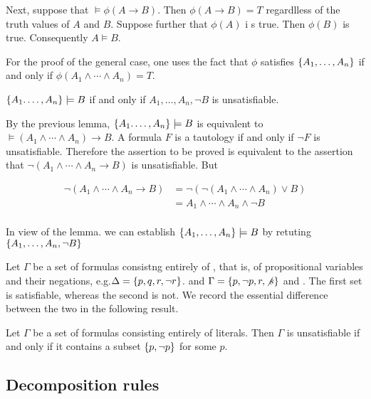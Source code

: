 Next, suppose that $\models \phi(A \to B)$.  Then $\phi(A \to B) = T$ regardlless of the truth values of $A$ and $B$.  Suppose further that $\phi(A)$ i s true. Then $\phi(B)$ is true.  Consequently $A \models B$.

For the proof of the general case, one uses the fact that $\phi$ satisfies $\{ A_1, \ldots, A_n \}$ if and only if $\phi(A_1 \land \cdots \land A_n) = T$. 

\begin{lemma}
$\{ A_1. \ldots , A_n \} \models B$ if and only if $A_1, \ldots , A_n, \neg B$ is unsatisfiable.
\end{lemma}

 By the previous lemma, $\{ A_1. \ldots , A_n \} \models B$  is equivalent to $\models (A_1 \land \cdots \land A_n) \to B$. A formula $F$ is a tautology if and only if $\neg F$ is unsatisfiable.  Therefore the assertion to be proved is equivalent to the assertion that $\neg (A_1 \land \cdots \land A_n \to B)$ is unsatisfiable.  But

\begin{align}
  \neg (A_1 \land \cdots \land A_n \to B) &=  \neg(\neg(A_1 \land \cdots \land A_n) \lor B) \\
  &= A_1 \land \cdots \land A_n \land \neg B \\
\end{align}


In view of the lemma. we can establish $\{ A_1, \ldots, A_n \} \models B$ by retuting $\{ A_1,  \ldots , A_n, \neg B \}$

Let $\Gamma$ be a set of formulas consistng entirely of , that is, of propositional variables and their negations, e.g.$\Delta = \{ p, q, r, \neg r \}$. and  $\Gamma = \{ p, \neg p, r, \not s \}$ and  . The first set is satisfiable, whereas the second is not.  We record the essential difference between the two in the following result.

\begin{lemma}
Let $\Gamma$ be a set of formulas consisting entirely of literals.  Then $\Gamma$ is unsatisfiable if and only if it contains a subset $\{ p, \neg p \}$ for some $p$.
\end{lemma}

\subsection{Decomposition rules}

